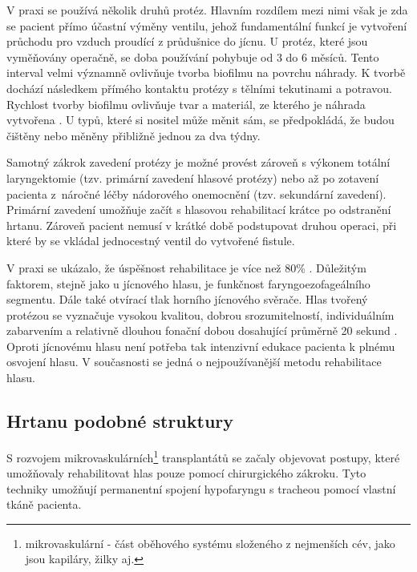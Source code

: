 V praxi se používá několik druhů protéz. Hlavním rozdílem mezi nimi však je
zda se pacient přímo účastní výměny ventilu, jehož fundamentální funkcí je
vytvoření průchodu pro vzduch proudící z průdušnice do jícnu. U protéz, které
jsou vyměňovány operačně, se doba používání pohybuje od 3 do 6 měsíců. Tento
interval velmi významně ovlivňuje tvorba biofilmu na povrchu náhrady. K tvorbě
dochází následkem přímého kontaktu protézy s tělními tekutinami a potravou.
Rychlost tvorby biofilmu ovlivňuje tvar a materiál, ze kterého je náhrada
vytvořena \cite{Leunisse2001}. U typů, které si nositel může měnit sám, se
předpokládá, že budou čištěny nebo měněny přibližně jednou za dva týdny.

Samotný zákrok zavedení protézy je možné provést zároveň s výkonem totální
laryngektomie (tzv. primární zavedení hlasové protézy) nebo až po zotavení
pacienta z~náročné léčby nádorového onemocnění (tzv. sekundární zavedení).
Primární zavedení umožňuje začít s hlasovou rehabilitací krátce po odstranění
hrtanu. Zároveň pacient nemusí v krátké době podstupovat druhou operaci, při
které by se vkládal jednocestný ventil do vytvořené fistule.

V praxi se ukázalo, že úspěšnost rehabilitace je více než 80\%
\cite{Slavicek2002}. Důležitým faktorem, stejně jako u jícnového hlasu, je
funkčnost faryngoezofageálního segmentu. Dále také otvírací tlak horního
jícnového svěrače. Hlas tvořený protézou se vyznačuje vysokou kvalitou, dobrou
srozumitelností, individuálním zabarvením a relativně dlouhou fonační dobou
dosahující průměrně 20 sekund \cite{Saito2003}. Oproti jícnovému hlasu není potřeba
tak intenzivní edukace pacienta k plnému osvojení hlasu. V současnosti se
jedná o nejpoužívanější metodu rehabilitace hlasu.




\subsection{Hrtanu podobné struktury} %
\label{chap:cause:tratment:structure}

S rozvojem mikrovaskulárních\footnote{mikrovaskulární - část oběhového systému
složeného z nejmenších cév, jako jsou kapiláry, žilky aj.} transplantátů se
začaly objevovat postupy, které umožňovaly rehabilitovat hlas pouze pomocí
chirurgického zákroku. Tyto techniky umožňují permanentní spojení hypofaryngu
s tracheou pomocí vlastní tkáně pacienta.

